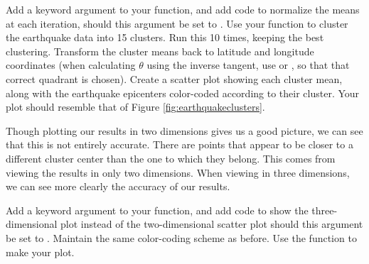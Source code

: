 \begin{problem}
Add a keyword argument  to your  function, and add code to normalize the means at each iteration, should this argument be set to .
Use your function to cluster the earthquake data into 15 clusters. Run this 10 times, keeping the best clustering.
Transform the cluster means back to latitude and longitude coordinates (when calculating $\theta$ using the inverse tangent, use  or ,
so that that correct quadrant is chosen).
Create a scatter plot showing each cluster mean, along with the earthquake epicenters color-coded according to their cluster. Your plot should resemble that of Figure \ref{fig:earthquakeclusters}.
\end{problem}

Though plotting our results in two dimensions gives us a good picture, we can see that this is not entirely accurate.  There are points that appear to be closer to a different cluster center than the one to which they belong.  This comes from viewing the results in only two dimensions.  When viewing in three dimensions, we can see more clearly the accuracy of our results.  
\begin{problem}
Add a keyword argument  to your  function, and add code to show the three-dimensional plot instead of the two-dimensional scatter plot should this argument be set to .  Maintain the same color-coding scheme as before.  Use the function  to make your plot.
\end{problem}

